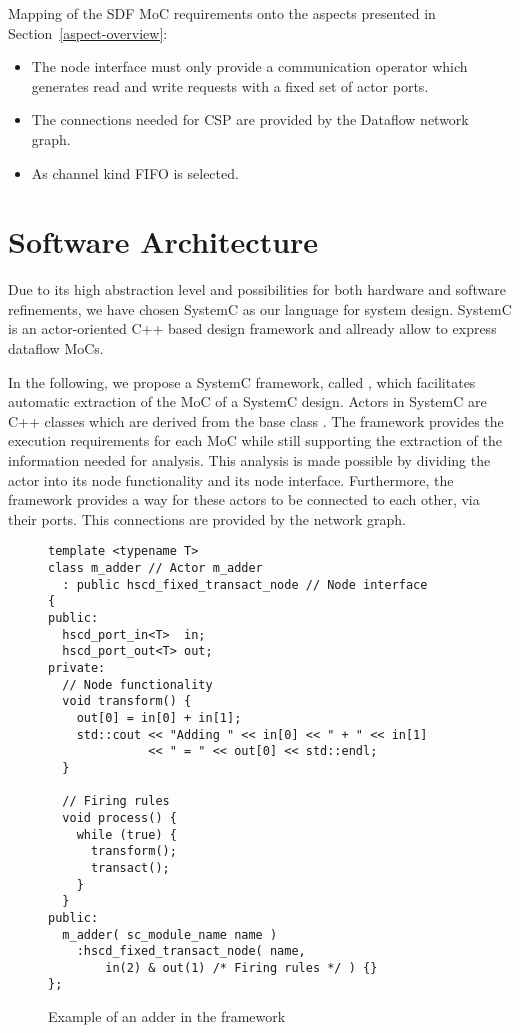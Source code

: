 Mapping of the SDF MoC requirements onto the aspects presented in
Section~\ref{aspect-overview}:

\begin{itemize}

\item The node interface must only provide a communication operator which
      generates read and write requests with a fixed set of actor ports.

\item The connections needed for CSP are provided by the Dataflow network graph.

\item As channel kind FIFO is selected.

\end{itemize}

\section{Software Architecture}\label{software-architecture}

Due to its high abstraction level and possibilities for both
hardware and software refinements, we have chosen SystemC
\cite{systemc-lrm:2003} \cite{glms:2002} as our language for system design.
SystemC is an actor-oriented C++ based design framework and
allready allow to express dataflow MoCs. 

In the following, we propose a SystemC framework, called \SysteMoC, which
facilitates automatic extraction of the MoC of a SystemC design.
Actors in SystemC are C++ classes which are derived from the base class .
The \SysteMoC{} framework provides the execution requirements for each MoC while
still supporting the extraction of the information needed for analysis.
This analysis is made possible by dividing the actor into its
node functionality and its node interface.
Furthermore, the \SysteMoC{} framework provides a way for these
actors to be connected to each other, via their ports. This connections
are provided by the network graph.

\begin{figure}
\centering
\begin{verbatim}
template <typename T>
class m_adder // Actor m_adder
  : public hscd_fixed_transact_node // Node interface
{
public:
  hscd_port_in<T>  in;
  hscd_port_out<T> out;
private:
  // Node functionality
  void transform() {
    out[0] = in[0] + in[1];
    std::cout << "Adding " << in[0] << " + " << in[1]
              << " = " << out[0] << std::endl;
  }
  
  // Firing rules
  void process() {
    while (true) {
      transform();
      transact();
    }
  }
public:
  m_adder( sc_module_name name )
    :hscd_fixed_transact_node( name,
        in(2) & out(1) /* Firing rules */ ) {}
};
\end{verbatim}
\caption{\label{example-adder-actor}Example of an adder in the \SysteMoC{} framework}
\end{figure}

